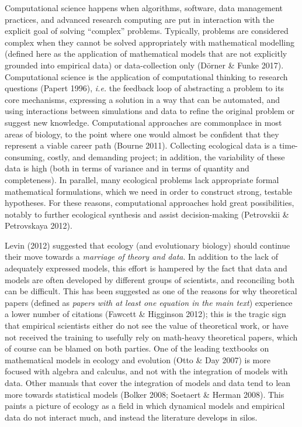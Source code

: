 \documentclass[12pt]{article}
\begin{document}
Computational science happens when algorithms, software, data management
practices, and advanced research computing are put in interaction with
the explicit goal of solving \enquote{complex} problems. Typically,
problems are considered complex when they cannot be solved appropriately
with mathematical modelling (defined here as the application of
mathematical models that are not explicitly grounded into empirical
data) or data-collection only (Dörner \& Funke 2017). Computational
science is the application of computational thinking to research
questions (Papert 1996), \emph{i.e.} the feedback loop of abstracting a
problem to its core mechanisms, expressing a solution in a way that can
be automated, and using interactions between simulations and data to
refine the original problem or suggest new knowledge. Computational
approaches are commonplace in most areas of biology, to the point where
one would almost be confident that they represent a viable career path
(Bourne 2011). Collecting ecological data is a time-consuming, costly,
and demanding project; in addition, the variability of these data is
high (both in terms of variance and in terms of quantity and
completeness). In parallel, many ecological problems lack appropriate
formal mathematical formulations, which we need in order to construct
strong, testable hypotheses. For these reasons, computational approaches
hold great possibilities, notably to further ecological synthesis and
assist decision-making (Petrovskii \& Petrovskaya 2012).

Levin (2012) suggested that ecology (and evolutionary biology) should
continue their move towards a \emph{marriage of theory and data}. In
addition to the lack of adequately expressed models, this effort is
hampered by the fact that data and models are often developed by
different groups of scientists, and reconciling both can be difficult.
This has been suggested as one of the reasons for why theoretical papers
(defined as \emph{papers with at least one equation in the main text})
experience a lower number of citations (Fawcett \& Higginson 2012); this
is the tragic sign that empirical scientists either do not see the value
of theoretical work, or have not received the training to usefully rely
on math-heavy theoretical papers, which of course can be blamed on both
parties. One of the leading textbooks on mathematical models in ecology
and evolution (Otto \& Day 2007) is more focused with algebra and
calculus, and not with the integration of models with data. Other
manuals that cover the integration of models and data tend to lean more
towards statistical models (Bolker 2008; Soetaert \& Herman 2008). This
paints a picture of ecology as a field in which dynamical models and
empirical data do not interact much, and instead the literature develops
in silos.
\end{document}
